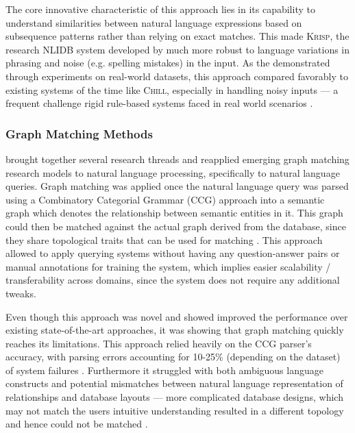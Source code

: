 The core innovative characteristic of this approach lies in its capability to understand similarities between natural 
language expressions based on subsequence patterns rather than relying on exact matches. This made \textsc{Krisp}, the 
research NLIDB system developed by \cite{StringKernels} much more robust to language variations in phrasing and noise 
(e.g. spelling mistakes) in the input. As the \citeauthor*{StringKernels} demonstrated through experiments on real-world 
datasets, this approach compared favorably to existing systems of the time like \textsc{Chill}, especially in handling 
noisy inputs — a frequent challenge rigid rule-based systems faced in real world scenarios \citep{StringKernels, 
ILPParsing}.

\subsubsection{Graph Matching Methods}

\cite{GraphMatching} brought together several research threads and reapplied emerging graph matching research models
to natural language processing, specifically to natural language queries. Graph matching was applied once the natural 
language query was parsed using a Combinatory Categorial Grammar (CCG) approach into a semantic graph which denotes the 
relationship between semantic entities in it. This graph could then be matched against the actual graph derived from 
the database, since they share topological traits that can be used for matching \citep{GraphMatching}. This approach 
allowed to apply querying systems without having any question-answer pairs or manual annotations for training the system, 
which implies easier scalability / transferability across domains, since the system does not require any additional 
tweaks.

Even though this approach was novel and showed improved the performance over existing state-of-the-art approaches, it
was showing that graph matching quickly reaches its limitations. This approach relied heavily on the CCG parser's 
accuracy, with parsing errors accounting for 10-25\% (depending on the dataset) of system failures \citep{GraphMatching}. 
Furthermore it struggled with both ambiguous language constructs and potential mismatches between natural language 
representation of relationships and database layouts — more complicated database designs, which may not match the users 
intuitive understanding resulted in a different topology and hence could not be matched \citep[p.~387]{GraphMatching}.

